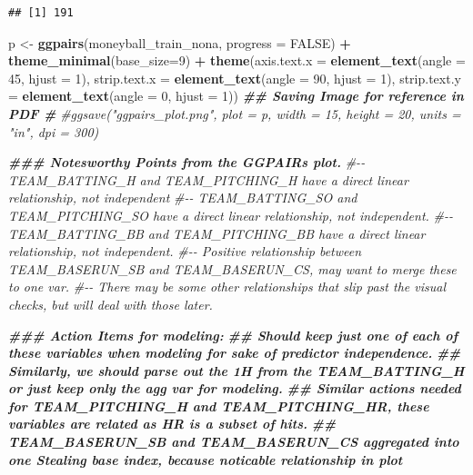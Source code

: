 \documentclass[
]{article}
\newenvironment{Shaded}{\begin{snugshade}}{\end{snugshade}}
\newcommand{\AttributeTok}[1]{\textcolor[rgb]{0.13,0.29,0.53}{#1}}
\newcommand{\CommentTok}[1]{\textcolor[rgb]{0.56,0.35,0.01}{\textit{#1}}}
\newcommand{\ConstantTok}[1]{\textcolor[rgb]{0.56,0.35,0.01}{#1}}
\newcommand{\DecValTok}[1]{\textcolor[rgb]{0.00,0.00,0.81}{#1}}
\newcommand{\DocumentationTok}[1]{\textcolor[rgb]{0.56,0.35,0.01}{\textbf{\textit{#1}}}}
\newcommand{\FunctionTok}[1]{\textcolor[rgb]{0.13,0.29,0.53}{\textbf{#1}}}
\newcommand{\NormalTok}[1]{#1}
\newcommand{\OtherTok}[1]{\textcolor[rgb]{0.56,0.35,0.01}{#1}}
\newcommand{\SpecialCharTok}[1]{\textcolor[rgb]{0.81,0.36,0.00}{\textbf{#1}}}
\begin{document}
\begin{verbatim}
## [1] 191
\end{verbatim}

\begin{Shaded}
\begin{Highlighting}[]
\NormalTok{p }\OtherTok{\textless{}{-}} \FunctionTok{ggpairs}\NormalTok{(moneyball\_train\_nona,}
           \AttributeTok{progress =} \ConstantTok{FALSE}\NormalTok{) }\SpecialCharTok{+}  
          \FunctionTok{theme\_minimal}\NormalTok{(}\AttributeTok{base\_size=}\DecValTok{9}\NormalTok{) }\SpecialCharTok{+}
  \FunctionTok{theme}\NormalTok{(}\AttributeTok{axis.text.x =} \FunctionTok{element\_text}\NormalTok{(}\AttributeTok{angle =} \DecValTok{45}\NormalTok{, }\AttributeTok{hjust =} \DecValTok{1}\NormalTok{),}
                                      \AttributeTok{strip.text.x =} \FunctionTok{element\_text}\NormalTok{(}\AttributeTok{angle =} \DecValTok{90}\NormalTok{, }\AttributeTok{hjust =} \DecValTok{1}\NormalTok{),}
                                     \AttributeTok{strip.text.y =} \FunctionTok{element\_text}\NormalTok{(}\AttributeTok{angle =} \DecValTok{0}\NormalTok{, }\AttributeTok{hjust =} \DecValTok{1}\NormalTok{))}
\DocumentationTok{\#\# Saving Image for reference in PDF \#}
\CommentTok{\#ggsave("ggpairs\_plot.png", plot = p, width = 15, height = 20, units = "in", dpi = 300)}

\DocumentationTok{\#\#\# Notesworthy Points from the GGPAIRs plot. }
\CommentTok{\#{-}{-} TEAM\_BATTING\_H and TEAM\_PITCHING\_H have a direct linear relationship, not independent}
\CommentTok{\#{-}{-} TEAM\_BATTING\_SO and TEAM\_PITCHING\_SO have a direct linear relationship, not independent.}
\CommentTok{\#{-}{-} TEAM\_BATTING\_BB and TEAM\_PITCHING\_BB have a direct linear relationship, not independent.}
\CommentTok{\#{-}{-} Positive relationship between TEAM\_BASERUN\_SB and TEAM\_BASERUN\_CS, may want to merge these to one var. }
\CommentTok{\#{-}{-} There may be some other relationships that slip past the visual checks, but will deal with those later. }

\DocumentationTok{\#\#\# Action Items for modeling:}
\DocumentationTok{\#\# Should keep just one of each of these variables when modeling for sake of predictor independence.}
\DocumentationTok{\#\# Similarly, we should parse out the 1H from the TEAM\_BATTING\_H or just keep only the agg var for modeling. }
\DocumentationTok{\#\# Similar actions needed for TEAM\_PITCHING\_H and TEAM\_PITCHING\_HR, these variables are related as HR is a subset of hits.}
\DocumentationTok{\#\# TEAM\_BASERUN\_SB and TEAM\_BASERUN\_CS aggregated into one Stealing base index, because noticable relationship in plot}
\end{Highlighting}
\end{Shaded}
\end{document}
